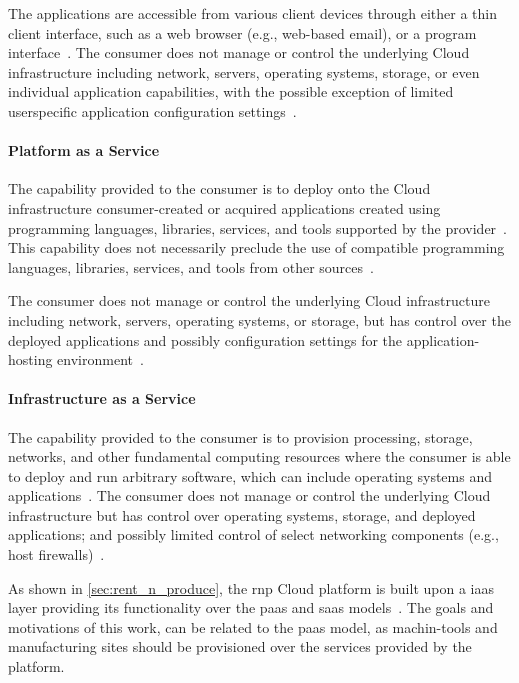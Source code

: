\documentclass[
a4paper,
twoside,
headsepline,
cleardoublepage=empty,
parskip=half,
draft=false
]{scrbook}
\begin{document}
			The applications are accessible from various client devices through either a thin client interface, such as a web browser (e.g., web-based email), or a program interface~\cite{mell2011nist}.
			The consumer does not manage or control the underlying Cloud infrastructure including network, servers, operating systems, storage, or even individual application capabilities, with the possible exception of limited userspecific application configuration settings~\cite{mell2011nist}.

			\paragraph{Platform as a Service} The capability provided to the consumer is to deploy onto the Cloud infrastructure consumer-created or acquired applications created using programming languages, libraries, services, and tools supported by the provider~\cite{fehling2014cloud}.
			This capability does not necessarily preclude the use of compatible programming languages, libraries, services, and tools from other sources~\cite{leymann2011cloud}.
			
			The consumer does not manage or control the underlying Cloud infrastructure including network, servers, operating systems, or storage, but has control over the deployed applications and possibly configuration settings for the application-hosting environment~\cite{leymann2011cloud}.

			\paragraph{Infrastructure as a Service} The capability provided to the consumer is to provision processing, storage, networks, and other fundamental computing resources where the consumer is able to deploy and run arbitrary software, which can include operating systems and applications~\cite{leymann2011cloud}. 
			The consumer does not manage or control the underlying Cloud infrastructure but has control over operating systems, storage, and deployed applications; and possibly limited control of select networking components (e.g., host firewalls)~\cite{mell2011nist}.

			As shown in \cref{sec:rent_n_produce}, the \gls{rnp} Cloud platform is built upon a \gls{iaas} layer providing its functionality over the \gls{paas} and \gls{saas} models~\cite{xen.17b}. 
			The goals and motivations of this work, can be related to the \gls{paas} model, as machin-tools and manufacturing sites should be provisioned over the services provided by the platform.
\end{document}
